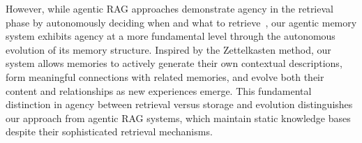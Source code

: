 However, while agentic RAG approaches demonstrate agency in the retrieval phase by autonomously deciding when and what to retrieve~\cite{asai2023self,jiang2023active,yu2023augmentation}, our agentic memory system exhibits agency at a more fundamental level through the autonomous evolution of its memory structure. Inspired by the Zettelkasten method, our system allows memories to actively generate their own contextual descriptions, form meaningful connections with related memories, and evolve both their content and relationships as new experiences emerge. This fundamental distinction in agency between retrieval versus storage and evolution distinguishes our approach from agentic RAG systems, which maintain static knowledge bases despite their sophisticated retrieval mechanisms.